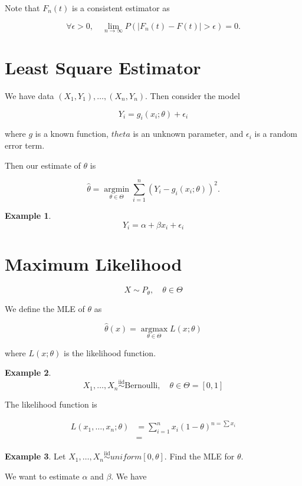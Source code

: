 \documentclass[12pt]{article}
\theoremstyle{definition}
\newtheorem*{example}{Example}
\begin{document}
Note that $F_n(t)$ is a consistent estimator as

$$ \forall \epsilon > 0, \quad \lim_{n \rightarrow \infty} P(|F_n(t) - F(t)| > \epsilon) = 0. $$


\section{Least Square Estimator}

We have data $(X_1, Y_1), \ldots, (X_n, Y_n)$. Then consider the model

$$Y_i = g_i(x_i; \theta) + \epsilon_i $$

where $g$ is a known function, $theta$ is an unknown parameter, and
$\epsilon_i$ is a random error term.

Then our estimate of $\theta$ is

\begin{equation*}
\widehat{\theta} = \operatorname*{argmin}_{\theta \in \Theta} \sum_{i = 1}^n (Y_i - g_i(x_i; \theta))^2.
\end{equation*}


\begin{example}
$$Y_i = \alpha + \beta x_i + \epsilon_i$$
\end{example}

\section{Maximum Likelihood}

$$ X \sim P_{\theta}, \quad \theta \in \Theta $$

We define the MLE of $\theta$ as

$$ \widehat{\theta}(x) = \operatorname*{argmax}_{\theta \in \Theta} L(x; \theta) $$

where $L(x; \theta)$ is the likelihood function.

\begin{example}
$$ X_1, \ldots, X_n \overset{\text{iid}}{\sim} \text{Bernoulli}, \quad \theta \in \Theta = [0,1] $$

The likelihood function is

\begin{align*}
L(x_1, \ldots, x_n; \theta) &= \sum_{i = 1}^n x_i (1 - \theta)^{n = \sum x_i} \\
&=
\end{align*}

\end{example}

\begin{example}
Let $X_1, \ldots, X_n \overset{\text{iid}}{\sim} uniform[0,\theta]$. Find the MLE for $\theta$.
\end{example}

We want to estimate $\alpha$ and $\beta$. We have
\end{document}
